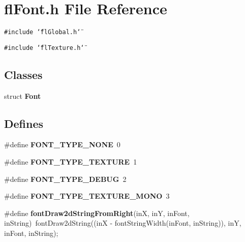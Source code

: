 \section{fl\-Font.h File Reference}
\label{flFont_8h}
{\tt \#include \char`\"{}fl\-Global.h\char`\"{}}\par
{\tt \#include \char`\"{}fl\-Texture.h\char`\"{}}\par
\subsection*{Classes}
\begin{CompactItemize}
\item 
struct {\bf Font}
\end{CompactItemize}
\subsection*{Defines}
\begin{CompactItemize}
\item 
\#define {\bf FONT\_\-TYPE\_\-NONE}~0
\item 
\#define {\bf FONT\_\-TYPE\_\-TEXTURE}~1
\item 
\#define {\bf FONT\_\-TYPE\_\-DEBUG}~2
\item 
\#define {\bf FONT\_\-TYPE\_\-TEXTURE\_\-MONO}~3
\item 
\#define {\bf font\-Draw2d\-String\-From\-Right}(in\-X, in\-Y, in\-Font, in\-String)~font\-Draw2d\-String((in\-X - font\-String\-Width(in\-Font, in\-String)), in\-Y, in\-Font, in\-String);
\end{CompactItemize}
